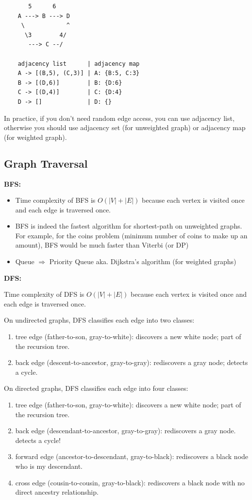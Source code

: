 \documentclass[12pt,a4paper]{article}
\begin{document}
\begin{verbatim}
       5      6
    A ---> B ---> D
     \            ^
      \3        4/
       ---> C --/

    adjacency list      | adjacency map
    A -> [(B,5), (C,3)] | A: {B:5, C:3}
    B -> [(D,6)]        | B: {D:6}
    C -> [(D,4)]        | C: {D:4}
    D -> []             | D: {}
\end{verbatim}

In practice, if you don't need random edge access, 
you can use adjacency list, otherwise you should use adjacency set (for unweighted graph) or adjacency map (for weighted graph).

\subsection*{Graph Traversal}

\textbf{BFS:}

\begin{itemize}
    \item Time complexity of BFS is \(O(|V| + |E|)\) because each vertex is visited once and each edge is traversed once.
    \item BFS is indeed the fastest algorithm for shortest-path on unweighted graphs. For example, for the coins problem (minimum number of coins to make up an amount), BFS would be much faster than Viterbi (or DP)
    \item Queue $\Rightarrow$ Priority Queue aka. Dijkstra's algorithm (for weighted graphs)
\end{itemize}

\textbf{DFS:}

Time complexity of DFS is \(O(|V| + |E|)\) because each vertex is visited once and each edge is traversed once.

On undirected graphs, DFS classifies each edge into two classes:

\begin{enumerate}
    \item tree edge (father-to-son, gray-to-white): discovers a new white node; part of the recursion tree.
    \item back edge (descent-to-ancestor, gray-to-gray): rediscovers a gray node; detects a cycle.
\end{enumerate}

On directed graphs, DFS classifies each edge into four classes:

\begin{enumerate}
    \item tree edge (father-to-son, gray-to-white): discovers a new white node; part of the recursion tree.
    \item back edge (descendant-to-ancestor, gray-to-gray): rediscovers a gray node. detects a cycle!
    \item forward edge (ancestor-to-descendant, gray-to-black): rediscovers a black node who is my descendant.
    \item cross edge (cousin-to-cousin, gray-to-black): rediscovers a black node with no direct ancestry relationship.
\end{enumerate}
\end{document}

